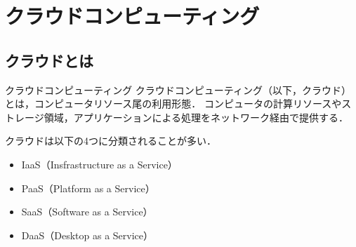 \section{クラウドコンピューティング}
\tocc
\subsection{クラウドとは}
\begin{frame}[t]{\ftitle}
    \begin{block}{クラウドコンピューティング}
        クラウドコンピューティング（以下，クラウド）とは，コンピュータリソース尾の利用形態．
        コンピュータの計算リソースやストレージ領域，アプリケーションによる処理をネットワーク経由で提供する．\hfill\cite{2015amazon}
    \end{block}
    クラウドは以下の4つに分類されることが多い．
    \begin{itemize}
        \item IaaS（Insfrastructure as a Service）
        \item PaaS（Platform as a Service）
        \item SaaS（Software as a Service）
        \item DaaS（Desktop as a Service）%
    \end{itemize}
\end{frame}
